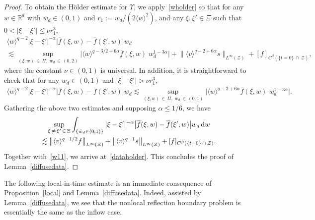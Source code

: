 \documentclass[10pt]{amsart}
\theoremstyle{definition}\newtheorem{defi}[theo]{Definition}\newtheorem{rema}[theo]{Remark}\newtheorem{exam}[theo]{Example}\newtheorem{exem}[theo]{Example}\newtheorem{nota}[theo]{Notation}
\newcommand*{\dif}{\mathop{}\!\mathrm{d}}
\newcommand*\R {\mathbb{R}}
\newcommand*\Z {\mathcal{Z}}
\newcommand{\la}{\langle}
\newcommand{\ra}{\rangle}
\newcommand{\lv}{\langle v\rangle}
\let\oldhat\hat
\renewcommand*{\hat}[1]{\mathchoice{\widehat{#1}}{\widehat{#1}}{\oldhat{#1}}{\oldhat{#1}}}
\begin{document}
\begin{proof}
To obtain the H\"older estimate for $\Upsilon$, we apply~\eqref{wholder} so that for any $w\in\R^d$ with $w_d\in(0,1)$ and $r_1:=w_d/(2\la w\ra^2)$, and any $\xi,\xi'\in\Xi$ such that $0<|\xi-\xi'|\le \nu r_1^3$,
\begin{multline*}
\la w\ra^{q-2}\left|\xi-\xi'\right|^{-\alpha}\big|\overline{f}(\xi,w)-\overline{f}(\xi',w)\big|w_d\\
\lesssim \sup_{(\xi,w)\,\in\,\Pi,\;\!w_d\,\in\,(0,2)} \big|\la w\ra^{q-3/2+6\alpha}\overline{f}(\xi,w)\;\!w_d^{1-3\alpha}\big| +\big\|\lv^{q-2+6\alpha}s\big\|_{L^\infty(\Z)} + [f]_{C^\beta(\{t=0\}\,\cap\,\Z)},
\end{multline*}
where the constant $\nu\in(0,1)$ is universal. In addition, it is straightforward to check that for any $w_d\in(0,1)$ and $|\xi-\xi'|>\nu r_1^3$,
\begin{align*}
\la w\ra^{q-2}\left|\xi-\xi'\right|^{-\alpha}\big|\overline{f}(\xi,w)-\overline{f}(\xi',w)\big|w_d
\lesssim \sup_{(\xi,w)\,\in\,\Pi,\;\!w_d\,\in\,(0,1)} \big|\la w\ra^{q-2+6\alpha}\overline{f}(\xi,w)\;\!w_d^{1-3\alpha}\big|.
\end{align*}
Gathering the above two estimates and supposing $\alpha\le1/6$, we have
\begin{multline*}
\sup_{\xi\,\neq\,\xi'\,\in\,\Xi}\int_{\left\{\hat{w}_d\in(0,1)\right\}} |\xi-\xi'|^{-\alpha}\big|\overline{f}(\xi,w)-\overline{f}(\xi',w)\big| w_d \dif w\\
\lesssim \big\|\lv^{q-1/2}f\big\|_{L^\infty(\Z)} + \big\|\lv^{q-1}s\big\|_{L^\infty(\Z)} + [f]_{C^\beta(\{t=0\}\,\cap\,\Z)}.
\end{multline*}
Together with~\eqref{w11}, we arrive at~\eqref{dataholder}. This concludes the proof of Lemma~\ref{diffusedata}.
\end{proof}

The following local-in-time estimate is an immediate consequence of Proposition~\ref{local} and Lemma~\ref{diffusedata}. Indeed, assisted by Lemma~\ref{diffusedata}, we see that the nonlocal reflection boundary problem is essentially the same as the inflow case.
\end{document}
